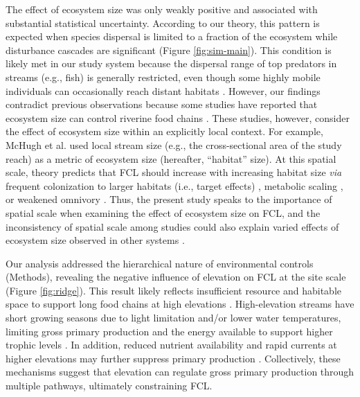 \documentclass[9pt,twocolumn,twoside]{pnas-new}
\begin{document}
The effect of ecosystem size was only weakly positive and associated with substantial statistical uncertainty.
According to our theory, this pattern is expected when species dispersal is limited to a fraction of the ecosystem while disturbance cascades are significant (Figure \ref{fig:sim-main}).
This condition is likely met in our study system because the dispersal range of top predators in streams (e.g., fish) is generally restricted, even though some highly mobile individuals can occasionally reach distant habitats \citep{comte_evidence_2018, radinger_patterns_2014}.
However, our findings contradict previous observations because some studies have reported that ecosystem size can control riverine food chains \citep{mchugh_dual_2010, mcintosh_capacity_2018, sabo_role_2010}.
These studies, however, consider the effect of ecosystem size within an explicitly local context.
For example, McHugh et al. \citep{mchugh_dual_2010} used local stream size (e.g., the cross-sectional area of the study reach) as a metric of ecosystem size (hereafter, ``habitat'' size).
At this spatial scale, theory predicts that FCL should increase with increasing habitat size \textit{via} frequent colonization to larger habitats (i.e., target effects) \citep{shibasaki_food_2024}, metabolic scaling \citep{mcintosh_capacity_2018}, or weakened omnivory \citep{ward_mechanistic_2017}.
Thus, the present study speaks to the importance of spatial scale when examining the effect of ecosystem size on FCL, and the inconsistency of spatial scale among studies could also explain varied effects of ecosystem size observed in other systems \citep{takimoto_environmental_2013}.

Our analysis addressed the hierarchical nature of environmental controls (Methods), revealing the negative influence of elevation on FCL at the site scale (Figure \ref{fig:ridge}).
This result likely reflects insufficient resource and habitable space to support long food chains at high elevations \citep{marzolf_ecosystem_2021, atkinson_determinants_2018}. 
High-elevation streams have short growing seasons due to light limitation and/or lower water temperatures, limiting gross primary production and the energy available to support higher trophic levels \citep{finlay_light-mediated_2011, finlay_stream_2011}. 
In addition, reduced nutrient availability and rapid currents at higher elevations may further suppress primary production \citep{finlay_light-mediated_2011, gomi_understanding_2002}. 
Collectively, these mechanisms suggest that elevation can regulate gross primary production through multiple pathways, ultimately constraining FCL.
\end{document}
